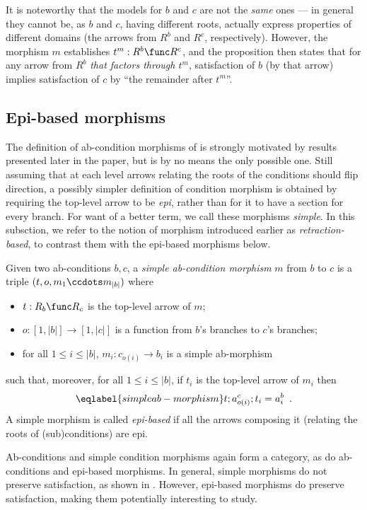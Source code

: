 It is noteworthy that the models for $b$ and $c$ are not the \emph{same} ones --- in general they cannot be, as $b$ and $c$, having different roots, actually express properties of different domains (the arrows from $R^b$ and $R^c$, respectively). However, the morphism $m$ establishes $t^m:R^b\func R^c$, and the proposition then states that for any arrow from $R^b$ \emph{that factors through $t^m$}, satisfaction of $b$ (by that arrow) implies satisfaction of $c$ by ``the remainder after $t^m$''.

\subsection{Epi-based morphisms}

The definition of ab-condition morphisms of  is strongly motivated by results presented later in the paper, but is by no means the only possible one. Still assuming that at each level arrows relating the roots of the conditions should flip direction, a possibly simpler definition of condition morphism is obtained by requiring the top-level arrow to be \emph{epi}, rather than for it to have a section for every branch. For want of a better term, we call these morphisms \emph{simple}. In this subsction, we refer to the notion of morphism introduced earlier as \emph{retraction-based}, to contrast them with the epi-based morphisms below.

\begin{definition}
  Given two ab-conditions $b,c$, a \emph{simple ab-condition morphism} $m$ from $b$ to $c$ is a triple $(t,o,m_1\ccdots m_{|b|})$ where
    \begin{itemize}
    \item $t:R_b\func R_c$ is the top-level arrow of $m$;
	\item $o:[1,|b|]\to[1,|c|]$ is a function from $b$'s branches to $c$'s branches;
  \item for all $1\leq i\leq |b|$, $m_i:c_{o(i)}\to b_i$ is a simple ab-morphism
  \end{itemize}
  such that, moreover, for all $1\leq i\leq |b|$, if $t_i$ is the top-level arrow of $m_i$ then
  \begin{equation}\eqlabel{simple ab-morphism}
  t;a^c_{o(i)};t_i=a^b_i \enspace.
  \end{equation}
  A simple morphism is called \emph{epi-based} if all the arrows composing it (relating the roots of (sub)conditions) are epi.
\end{definition}
%
Ab-conditions and simple condition morphisms again form a category, as do ab-conditions and epi-based morphisms.
In general, simple morphisms do not preserve satisfaction, as shown in . However, epi-based morphisms do preserve satisfaction, making them potentially interesting to study.

